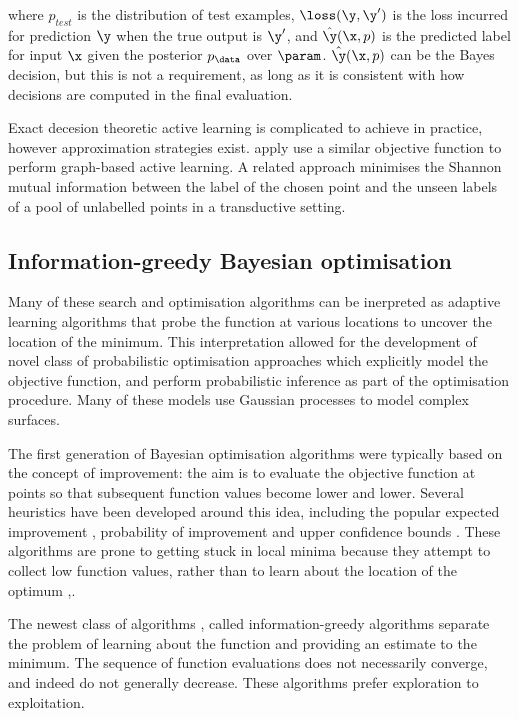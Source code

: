 where $p_{test}$ is the distribution of test examples, $\loss(\y,\y')$ is the loss incurred for prediction $\y$ when the true output is $\y'$, and $\hat{\y}(\x,p)$ is the predicted label for input $\x$ given the posterior $p_\data$ over $\param$. $\hat{\y}(\x,p)$ can be the Bayes decision, but this is not a requirement, as long as it is consistent with how decisions are computed in the final evaluation.

Exact decesion theoretic active learning is complicated to achieve in practice, however approximation strategies exist. \citet{} apply \citet{ZhuGhahramani} use a similar objective function to perform graph-based active learning.
A related approach minimises the Shannon mutual information between the label of the chosen point and the unseen labels of a pool of unlabelled points in a transductive setting.

\subsection{Information-greedy Bayesian optimisation}


Many of these search and optimisation algorithms can be inerpreted as adaptive learning algorithms that probe the function at various locations to uncover the location of the minimum. This interpretation allowed for the development of novel class of probabilistic optimisation approaches which explicitly model the objective function, and perform probabilistic inference as part of the optimisation procedure. Many of these models use Gaussian processes to model complex surfaces.

The first generation of Bayesian optimisation algorithms were typically based on the concept of improvement: the aim is to evaluate the objective function at points so that subsequent function values become lower and lower. Several heuristics have been developed around this idea, including the popular expected improvement \citep{Mockus1982,Jones1998, Frean2008}, probability of improvement \citep{Jones2001,Lizotte2008} and upper confidence bounds \citep{Srinivas2009}. These algorithms are prone to getting stuck in local minima because they attempt to collect low function values, rather than to learn about the location of the optimum \citep{Hennig2012entropy},.

The newest class of algorithms \citep{Hennig2012entropy}, called information-greedy algorithms separate the problem of learning about the function and providing an estimate to the minimum. The sequence of function evaluations does not necessarily converge, and indeed do not generally decrease. These algorithms prefer exploration to exploitation.

